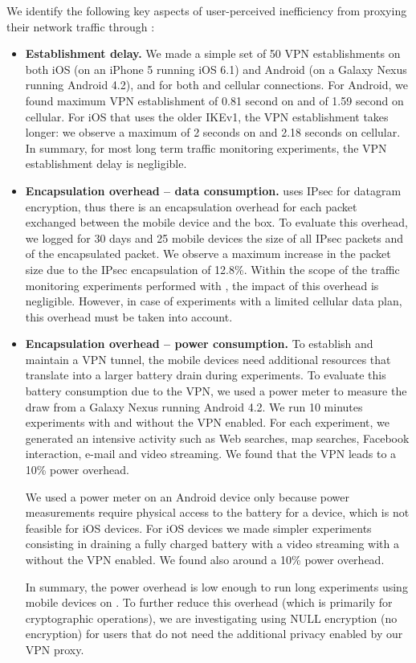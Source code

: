 We identify the following key aspects of user-perceived inefficiency from 
proxying their network traffic through \platname{}: 
\begin{itemize}
\item \textbf{Establishment delay.} We made a simple set of 50 VPN establishments on both iOS (on an
iPhone 5 running iOS 6.1) and Android (on a Galaxy Nexus running
Android 4.2), and for both \wifi{} and cellular connections. For
Android, we found maximum VPN establishment of 0.81 second on \wifi{}
and of 1.59 second on cellular. For iOS that uses the older IKEv1, the
VPN establishment takes longer: we observe a maximum of 2 seconds on
\wifi{} and 2.18 seconds on cellular.  In summary, for most long term
traffic monitoring experiments, the VPN establishment delay is
negligible. 
\item \textbf{Encapsulation overhead -- data consumption.} \platname{} uses IPsec for datagram encryption, thus there is
an encapsulation overhead for each packet exchanged between the mobile
device and the \platname{} box. To evaluate this overhead, we logged
for 30 days and 25 mobile devices the size of all IPsec packets and of
the encapsulated packet. We observe a maximum increase in the packet
size due to the IPsec encapsulation of 12.8\%. Within the scope of the
traffic monitoring experiments performed with \platname{}, the impact
of this overhead is negligible. However, in case of experiments with a
limited cellular data plan, this overhead must be taken into account.

\item \textbf{Encapsulation overhead -- power consumption.}
To establish and maintain a VPN tunnel, the mobile devices need
additional resources that translate into a larger battery drain during
experiments. To evaluate this battery consumption due to the VPN, we
used a power meter to measure the draw from a Galaxy Nexus running
Android 4.2. We run 10 minutes experiments with and without the VPN
enabled. For each experiment, we generated an intensive activity such
as Web searches, map searches, Facebook interaction, e-mail and video
streaming. We found that the VPN leads to a 10\% power overhead. 

We used a power meter on an Android device only because power
measurements require physical access to the battery for a device,
which is not feasible for iOS devices. For iOS devices we made
simpler experiments consisting in draining a fully charged battery with
a video streaming with a without the VPN enabled. We found also around
a 10\% power overhead. 

In summary, the power overhead is low enough to run long experiments
using mobile devices on \platname. To further reduce this overhead (which 
is primarily for cryptographic operations), we are investigating using NULL 
encryption (\ie no encryption) for users that do not need 
the additional privacy enabled by our VPN proxy.

\end{itemize}

